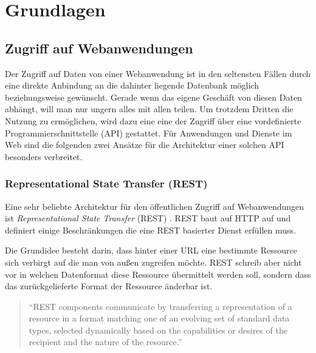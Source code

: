 

\chapter{Grundlagen} %
\label{cha:grundlagen}


\section{Zugriff auf Webanwendungen} %
\label{sec:zugriff_auf_webanwendungen}

Der Zugriff auf Daten von einer Webanwendung ist in den seltensten Fällen durch eine direkte Anbindung an die dahinter liegende Datenbank möglich beziehungsweise gewünscht. Gerade wenn das eigene Geschäft von diesen Daten abhängt, will man nur ungern alles mit allen teilen. Um trotzdem Dritten die Nutzung zu ermöglichen, wird dazu eine eine der Zugriff über eine vordefinierte Programmierschnittstelle (API) gestattet. Für Anwendungen und Dienste im Web sind die folgenden zwei Ansätze für die Architektur einer solchen API besonders verbreitet. 

\subsection{Representational State Transfer (REST)} %
\label{sub:rest}

Eine sehr beliebte Architektur für den öffentlichen Zugriff auf Webanwendungen ist \emph{Representational State Transfer} (REST) \cite[S.\,76]{fielding2000architectural}. REST baut auf HTTP auf und definiert einige Beschränkungen die eine REST basierter Dienst erfüllen muss. 

Die Grundidee besteht darin, dass hinter einer URL eine bestimmte Ressource sich verbirgt auf die man von außen zugreifen möchte. REST schreib aber nicht vor in welchen Datenformat diese Ressource übermittelt werden soll, sondern dass das zurückgelieferte Format der Ressource änderbar ist. 

\begin{quote}
\enquote{REST components communicate by transferring a representation of a resource
in a format matching one of an evolving set of standard data types, selected dynamically
based on the capabilities or desires of the recipient and the nature of the resource.}\cite[S.\,87]{fielding2000architectural} 

\end{quote}

